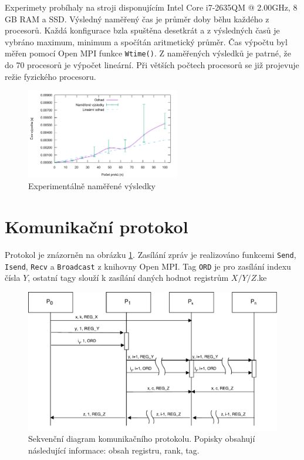 \documentclass[11pt,a4paper]{article}
\begin{document}
Experimety probíhaly na stroji disponujícím Intel Core i7-2635QM @ 2.00GHz, 8 GB RAM a SSD. Výsledný naměřený čas je průměr doby běhu každého z procesorů. Každá konfigurace bzla spuštěna desetkrát a z výsledných časů je vybráno maximum, minimum a spočítán aritmetický průměr. Čas výpočtu byl měřen pomocí Open MPI funkce \texttt{Wtime()}. Z naměřených výsledků je patrné, že do 70 procesorů je výpočet lineární. Při větších počtech procesorů se již projevuje režie fyzického procesoru.

\begin{figure}[!ht]
    \centering
		\includegraphics[width=0.6\textwidth]{results}
    \caption{Experimentálně naměřené výsledky}
\end{figure}

\section{Komunikační protokol}
\label{proto}

Protokol je znázorněn na obrázku \ref{proto_schema}. Zasílání zpráv je realizováno funkcemi \texttt{Send}, \texttt{Isend}, \texttt{Recv} a \texttt{Broadcast} z knihovny Open MPI. Tag \texttt{ORD} je pro zasílání indexu čísla $Y$, ostatní tagy slouží k zasílání daných hodnot registrům $X/Y/Z$.ke

\begin{figure}[!h]
    \includegraphics[width=0.8\linewidth]{protokol}
    \centering
    \caption{Sekvenční diagram komunikačního protokolu. Popisky obsahují následující informace: obsah registru, rank, tag.}
    \label{proto_schema}
\end{figure}
\end{document}
